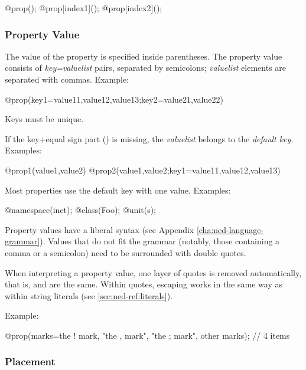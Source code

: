 \begin{ned}
@prop();
@prop[index1]();
@prop[index2]();
\end{ned}


\subsubsection{Property Value}
\label{sec:ned-ref:property-value}

The value of the property is specified inside parentheses. The property value consists of
\textit{key=valuelist} pairs, separated by semicolons; \textit{valuelist} elements
are separated with commas. Example:

\begin{ned}
@prop(key1=value11,value12,value13;key2=value21,value22)
\end{ned}

Keys must be unique.

If the key+equal sign part () is missing, the \textit{valuelist} belongs
to the \textit{default key}. Examples:

\begin{ned}
@prop1(value1,value2)
@prop2(value1,value2;key1=value11,value12,value13)
\end{ned}

Most properties use the default key with one value. Examples:

\begin{ned}
@namespace(inet);
@class(Foo);
@unit(s);
\end{ned}

Property values have a liberal syntax (see Appendix \ref{cha:ned-language-grammar}).
Values that do not fit the grammar (notably, those containing a comma or
a semicolon) need to be surrounded with double quotes.

When interpreting a property value, one layer of quotes is removed
automatically, that is,  and  are the same.
Within quotes, escaping works in the same way as within string literals
(see \ref{sec:ned-ref:literals}).

Example:

\begin{ned}
@prop(marks=the ! mark, "the , mark", "the ; mark", other marks); // 4 items
\end{ned}


\subsubsection{Placement}
\label{sec:ned-ref:property-placement}

